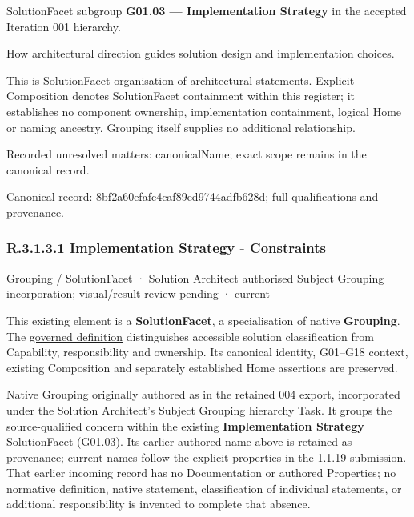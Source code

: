 SolutionFacet subgroup \textbf{G01.03 — Implementation Strategy} in the accepted Iteration 001 hierarchy.



How architectural direction guides solution design and implementation choices.



This is SolutionFacet organisation of architectural statements. Explicit Composition denotes SolutionFacet containment within this register; it establishes no component ownership, implementation containment, logical Home or naming ancestry. Grouping itself supplies no additional relationship.


{\small Recorded unresolved matters: canonicalName; exact scope remains in the canonical record.}\par
{\footnotesize \href{../../../../../../../continuum/grouping/8bf2a60efafc4caf89ed9744adfb628d.md}{Canonical record: 8bf2a60efafc4caf89ed9744adfb628d}; full qualifications and provenance.}\par
\subsubsection*{R.3.1.3.1 Implementation Strategy - Constraints}
\label{navigation:R.3.1.3.1}

\label{element:549a5d805b3f40d49437ce704f923bf0}
{\small Grouping / SolutionFacet · Solution Architect authorised Subject Grouping incorporation; visual/result review pending · current}\par

This existing element is a \textbf{SolutionFacet}, a specialisation of native
\textbf{Grouping}. The \href{\detokenize{../../../../../../../governance/continuum-representation.md#solutionfacet-classification--1119-candidate}}{governed definition}
distinguishes accessible solution classification from Capability, responsibility
and ownership. Its canonical identity, G01–G18 context, existing Composition
and separately established Home assertions are preserved.



Native Grouping originally authored as \texttt{} in the retained 004 export,
incorporated under the Solution Architect's Subject Grouping hierarchy Task.
It groups the source-qualified \texttt{} concern within
the existing \textbf{Implementation Strategy} SolutionFacet (G01.03). Its earlier authored name above is retained as provenance; current names
follow the explicit properties in the 1.1.19 submission.
That earlier incoming record has no Documentation or authored Properties; no normative
definition, native statement, classification of individual statements, or
additional responsibility is invented to complete that absence.



